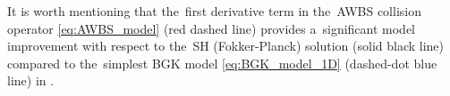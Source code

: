 It is worth mentioning that the~first derivative term in 
the~AWBS collision operator \eqref{eq:AWBS_model} (red dashed line) provides 
a~significant model improvement with respect to the~SH (Fokker-Planck) solution
(solid black line) compared to the~simplest BGK model \eqref{eq:BGK_model_1D}
(dashed-dot blue line) in .



